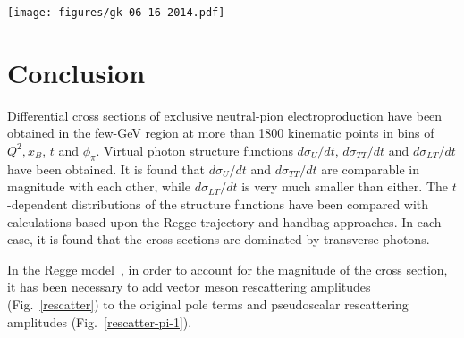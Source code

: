 \documentclass[prc,floatfix,twocolumn,superscriptaddress,letter]{revtex4}
\begin{document}
\begin{figure*}
\begin{center}
\texttt{[image: figures/gk-06-16-2014.pdf]}

\end{center}
\caption{\label{GK_full_kin} 
(Color online) The extracted structure functions vs. $t$ as in  Fig.~\ref{fig:structure_functions} for all kinematic bins. The data and curves are as follows:  black (positive)-$d\sigma_U/dt =d\sigma_T/dt +\epsilon d\sigma_L/dt$,\  blue (negative)-$d\sigma_{TT}/dt$,  and  red (small)-$d\sigma_{LT}/dt$.  All the structure functions are numerically given in  Appendix~\ref{strfun_table}. 
The error bars are statistical only. The point-by-point propagated systematic uncertainties are given in the table~in Appendix~\ref{strfun_table}. The curves are theoretical predictions for these structure functions obtained in the framework of the handbag model  by Ref.~\cite{GK-ps-11}. As before, black (positive)-$d\sigma_U/dt =d\sigma_T/dt +\epsilon d\sigma_L/dt$,\  blue (negative)-$d\sigma_{TT}/dt$,  and  red (small)-$d\sigma_{LT}/dt$.}
\end{figure*} 


\section{Conclusion}
Differential cross sections of exclusive neutral-pion electroproduction have been obtained in the few-GeV region at more than 1800 kinematic points in  bins of $Q^2, x_B$, $t$ and $\phi_\pi$. 
Virtual photon structure functions  $d\sigma_U/dt$, $d\sigma_{TT}/dt$ and $d\sigma_{LT}/dt$ have been obtained. It is found that $d\sigma_U/dt$ and $d\sigma_{TT}/dt$ are comparable in magnitude with each other, while $d\sigma_{LT}/dt$ is very much smaller than either. The $t$-dependent distributions of the structure functions have been compared with calculations based upon the Regge trajectory and handbag approaches. 
In each case, it is found that the cross sections are dominated by transverse photons.

In the Regge model~\cite{Laget}, in order to account for the magnitude of the cross section, it has been necessary to add vector meson rescattering amplitudes (Fig.~\ref{rescatter}) to the original pole terms and pseudoscalar  rescattering amplitudes (Fig.~\ref{rescatter-pi-1}).  
\end{document}
